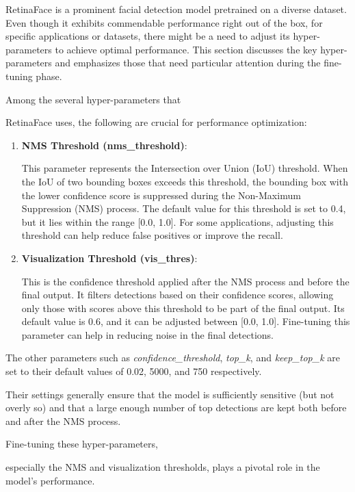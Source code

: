 \documentclass{article}
\begin{document}
RetinaFace is a prominent facial detection model pretrained on a diverse dataset. Even though it exhibits commendable performance right out of the box, for specific applications or datasets, there might be a need to adjust its hyper-parameters to achieve optimal performance. This section discusses the key hyper-parameters and emphasizes those that need particular attention during the fine-tuning phase.

Among the several hyper-parameters that 

RetinaFace uses, the following are crucial for performance optimization:

\begin{enumerate}
    \item \textbf{NMS Threshold (nms\_threshold)}: 
    
    This parameter represents the Intersection over Union (IoU) threshold. When the IoU of two bounding boxes exceeds this threshold, the bounding box with the lower confidence score is suppressed during the Non-Maximum Suppression (NMS) process. The default value for this threshold is set to 0.4, but it lies within the range [0.0, 1.0]. For some applications, adjusting this threshold can help reduce false positives or improve the recall.
    
    \item \textbf{Visualization Threshold (vis\_thres)}: 
    
    This is the confidence threshold applied after the NMS process and before the final output. It filters detections based on their confidence scores, allowing only those with scores above this threshold to be part of the final output. Its default value is 0.6, and it can be adjusted between [0.0, 1.0]. Fine-tuning this parameter can help in reducing noise in the final detections.
\end{enumerate}

The other parameters such as \textit{confidence\_threshold}, \textit{top\_k}, and \textit{keep\_top\_k} are set to their default values of 0.02, 5000, and 750 respectively. 

Their settings generally ensure that the model is sufficiently sensitive (but not overly so) and that a large enough number of top detections are kept both before and after the NMS process.

Fine-tuning these hyper-parameters, 

especially the NMS and visualization thresholds, plays a pivotal role in the model's performance. 
\end{document}
